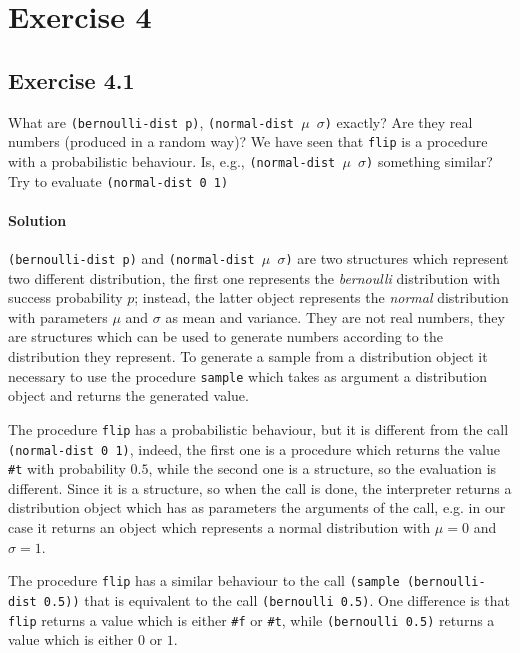 \section*{Exercise 4}

\subsection*{Exercise 4.1}
What are \texttt{(bernoulli-dist p)}, \texttt{(normal-dist $\mu$ $\sigma$)} exactly? Are they real numbers 
(produced in a random way)?
We have seen that \texttt{flip} is a procedure with a probabilistic behaviour. 
Is, e.g., \texttt{(normal-dist $\mu$ $\sigma$)} something similar?
Try to evaluate \texttt{(normal-dist 0 1)}

\paragraph{Solution}
\texttt{(bernoulli-dist p)} and \texttt{(normal-dist $\mu$ $\sigma$)} are two structures which represent 
two different distribution, the first one represents the \textit{bernoulli} distribution with success probability $p$; 
instead, the latter object represents the \textit{normal} distribution with parameters $\mu$ and $\sigma$ as mean and variance.
They are not real numbers, they are structures which can be used to generate numbers according to the distribution they represent.
To generate a sample from a distribution object it necessary to use the procedure \texttt{sample} which takes as argument a 
distribution object and returns the generated value.

The procedure \texttt{flip} has a probabilistic behaviour, but it is different from the call \texttt{(normal-dist 0 1)}, indeed, the 
first one is a procedure which returns the value \texttt{\#t} with probability $0.5$, while the second one is a structure, so the 
evaluation is different. Since it is a structure, so when the call is done, the interpreter returns a distribution object which
has as parameters the arguments of the call, e.g. in our case it returns an object which represents a normal distribution with 
$ \mu = 0 $ and $ \sigma = 1 $.

The procedure \texttt{flip} has a similar behaviour to the call \texttt{(sample (bernoulli-dist 0.5))} that is equivalent to the call
\texttt{(bernoulli 0.5)}. One difference is that \texttt{flip} returns a value which is either \texttt{\#f} or \texttt{\#t}, while 
\texttt{(bernoulli 0.5)} returns a value which is either $0$ or $1$.


